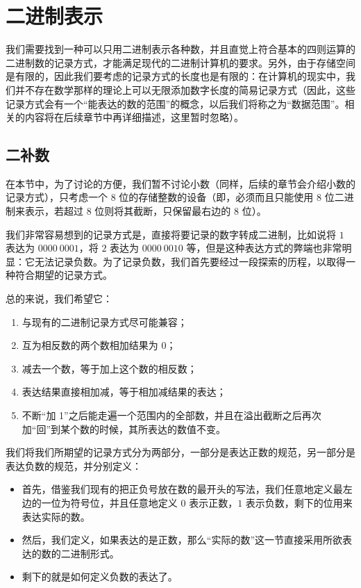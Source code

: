 \section{二进制表示}\label{sec:NumberSystemBasics/BinaryPresentation}
    我们需要找到一种可以只用二进制表示各种数，并且直觉上符合基本的四则运算的二进制数的记录方式，才能满足现代的二进制计算机的要求。另外，由于存储空间是有限的，因此我们要考虑的记录方式的长度也是有限的：在计算机的现实中，我们并不存在数学那样的理论上可以无限添加数字长度的简易记录方式（因此，这些记录方式会有一个“能表达的数的范围”的概念，以后我们将称之为“数据范围”。相关的内容将在后续章节中再详细描述，这里暂时忽略）。

    \subsection{二补数}\label{subsec:NumberSystemBasics/BinaryPresentation/TwosComplement}
        在本节中，为了讨论的方便，我们暂不讨论小数（同样，后续的章节会介绍小数的记录方式），只考虑一个 $8$ 位的存储整数的设备（即，必须而且只能使用 $8$ 位二进制来表示，若超过 $8$ 位则将其截断，只保留最右边的 $8$ 位）。

        我们非常容易想到的记录方式是，直接将要记录的数字转成二进制，比如说将 $1$ 表达为 $0000\ 0001$，将 $2$ 表达为 $0000\ 0010$ 等，但是这种表达方式的弊端也非常明显：它无法记录负数。为了记录负数，我们首先要经过一段探索的历程，以取得一种符合期望的记录方式。

        总的来说，我们希望它：
        \begin{enumerate}
            \item 与现有的二进制记录方式尽可能兼容；
            \item 互为相反数的两个数相加结果为 $0$；
            \item 减去一个数，等于加上这个数的相反数；
            \item 表达结果直接相加减，等于相加减结果的表达；
            \item 不断“加 1”之后能走遍一个范围内的全部数，并且在溢出截断之后再次加“回”到某个数的时候，其所表达的数值不变。
        \end{enumerate}

        我们将我们所期望的记录方式分为两部分，一部分是表达正数的规范，另一部分是表达负数的规范，并分别定义：
        \begin{itemize}
            \item 首先，借鉴我们现有的把正负号放在数的最开头的写法，我们任意地定义最左边的一位为符号位，并且任意地定义 $0$ 表示正数，$1$ 表示负数，剩下的位用来表达实际的数。
            \item 然后，我们定义，如果表达的是正数，那么“实际的数”这一节直接采用所欲表达的数的二进制形式。
            \item 剩下的就是如何定义负数的表达了。
        \end{itemize}

